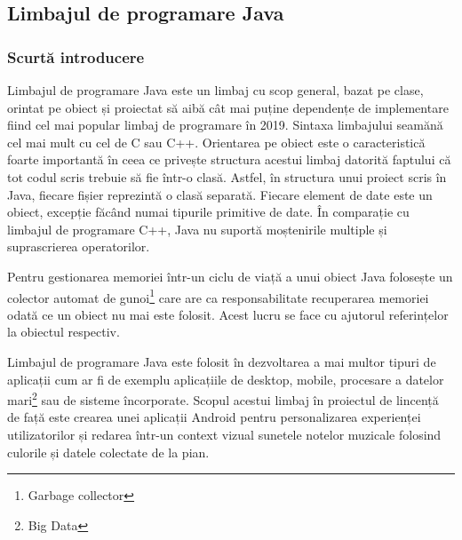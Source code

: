 \documentclass[../IoMusT.tex]{subfiles}
\begin{document}
\subsection{Limbajul de programare Java}
\subsubsection{Scurtă introducere}
Limbajul de programare Java este un limbaj cu scop general, bazat pe clase, orintat pe obiect și proiectat să aibă	cât mai puține dependențe de implementare fiind cel mai popular limbaj de programare în 2019. Sintaxa limbajului seamănă cel mai mult cu cel de C sau C++. Orientarea pe obiect este o caracteristică foarte importantă în ceea ce privește structura acestui limbaj datorită faptului că tot codul scris trebuie să fie într-o clasă. Astfel, în structura unui proiect scris în Java, fiecare fișier reprezintă o clasă separată. Fiecare element de date este un obiect, excepție făcând numai tipurile primitive de date. În comparație cu limbajul de programare C++, Java nu suportă moștenirile multiple și suprascrierea operatorilor.
\\
\par Pentru gestionarea memoriei într-un ciclu de viață a unui obiect Java folosește un colector automat de gunoi\footnote{Garbage collector} care are ca responsabilitate recuperarea memoriei odată ce un obiect nu mai este folosit. Acest lucru se face cu ajutorul referințelor la obiectul respectiv.
\\
\par Limbajul de programare Java este folosit în dezvoltarea a mai multor tipuri de aplicații cum ar fi de exemplu aplicațiile de desktop, mobile, procesare a datelor mari\footnote{Big Data} sau de sisteme încorporate. Scopul acestui limbaj în proiectul de lincență de față este crearea unei aplicații Android pentru personalizarea experienței utilizatorilor și redarea într-un context vizual sunetele notelor muzicale folosind culorile și datele colectate de la pian.
\end{document}
